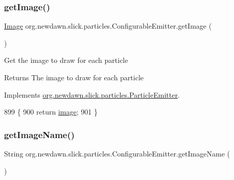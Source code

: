 \subsubsection{\texorpdfstring{get\+Image()}{getImage()}}
{\footnotesize\ttfamily \mbox{\hyperlink{classorg_1_1newdawn_1_1slick_1_1_image}{Image}} org.\+newdawn.\+slick.\+particles.\+Configurable\+Emitter.\+get\+Image (\begin{DoxyParamCaption}{ }\end{DoxyParamCaption})\hspace{0.3cm}{\ttfamily [inline]}}

Get the image to draw for each particle

\begin{DoxyReturn}{Returns}
The image to draw for each particle 
\end{DoxyReturn}


Implements \mbox{\hyperlink{interfaceorg_1_1newdawn_1_1slick_1_1particles_1_1_particle_emitter_a8a4c81c409b505d6708519c492660746}{org.\+newdawn.\+slick.\+particles.\+Particle\+Emitter}}.


\begin{DoxyCode}
899                             \{
900         \textcolor{keywordflow}{return} \mbox{\hyperlink{classorg_1_1newdawn_1_1slick_1_1particles_1_1_configurable_emitter_a88bff6e9d28f85572e862e9bd8eb6712}{image}};
901     \}
\end{DoxyCode}
\mbox{\label{classorg_1_1newdawn_1_1slick_1_1particles_1_1_configurable_emitter_a7bf7f9630e0c8ca6a2903da8128d325f}} 
\subsubsection{\texorpdfstring{get\+Image\+Name()}{getImageName()}}
{\footnotesize\ttfamily String org.\+newdawn.\+slick.\+particles.\+Configurable\+Emitter.\+get\+Image\+Name (\begin{DoxyParamCaption}{ }\end{DoxyParamCaption})\hspace{0.3cm}{\ttfamily [inline]}}

